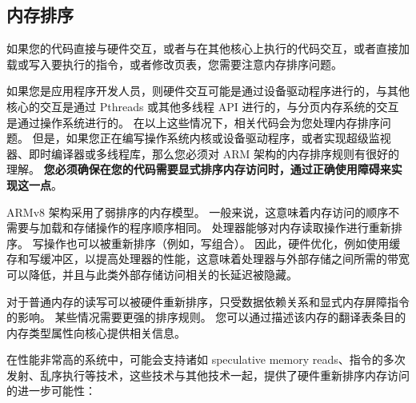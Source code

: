 \subsection{内存排序} \label{sec:memory-ordering}

如果您的代码直接与硬件交互，或者与在其他核心上执行的代码交互，或者直接加载或写入要执行的指令，或者修改页表，您需要注意内存排序问题。

如果您是应用程序开发人员，则硬件交互可能是通过设备驱动程序进行的，与其他核心的交互是通过 Pthreads 或其他多线程 API 进行的，与分页内存系统的交互是通过操作系统进行的。
在以上这些情况下，相关代码会为您处理内存排序问题。
但是，如果您正在编写操作系统内核或设备驱动程序，或者实现超级监视器、即时编译器或多线程库，那么您必须对 ARM 架构的内存排序规则有很好的理解。
\textbf{您必须确保在您的代码需要显式排序内存访问时，通过正确使用障碍来实现这一点}。

ARMv8 架构采用了弱排序的内存模型。
一般来说，这意味着内存访问的顺序不需要与加载和存储操作的程序顺序相同。
处理器能够对内存读取操作进行重新排序。
写操作也可以被重新排序（例如，写组合）。
因此，硬件优化，例如使用缓存和写缓冲区，以提高处理器的性能，这意味着处理器与外部存储之间所需的带宽可以降低，并且与此类外部存储访问相关的长延迟被隐藏。

对于普通内存的读写可以被硬件重新排序，只受数据依赖关系和显式内存屏障指令的影响。
某些情况需要更强的排序规则。
您可以通过描述该内存的翻译表条目的内存类型属性向核心提供相关信息。

在性能非常高的系统中，可能会支持诸如 speculative memory reads、指令的多次发射、乱序执行等技术，这些技术与其他技术一起，提供了硬件重新排序内存访问的进一步可能性：

